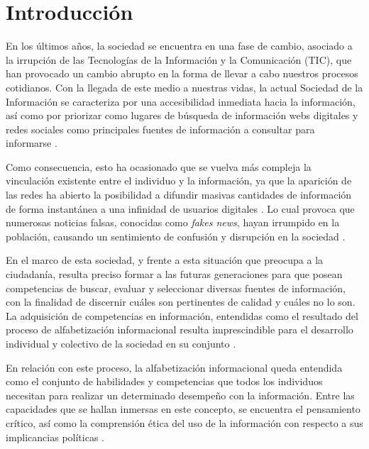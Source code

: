 \documentclass[spanish]{textolivre}
\begin{document}
\begin{polyabstract}
\begin{english}
\begin{abstract}
\end{abstract}
\end{english}

\end{polyabstract}


\section{Introducción}\label{intro}
En los últimos años, la sociedad se encuentra en una fase de cambio, asociado a la irrupción de las Tecnologías de la Información y la Comunicación (TIC), que han provocado un cambio abrupto en la forma de llevar a cabo nuestros procesos cotidianos. Con la llegada de este medio a nuestras vidas, la actual Sociedad de la Información se caracteriza por una accesibilidad inmediata hacia la información, así como por priorizar como lugares de búsqueda de información webs digitales y redes sociales como principales fuentes de información a consultar para informarse \cite{alfonso2019}. %

Como consecuencia, esto ha ocasionado que se vuelva más compleja la vinculación existente entre el individuo y la información, ya que la aparición de las redes ha abierto la posibilidad a difundir masivas cantidades de información de forma instantánea a una infinidad de usuarios digitales \cite{alonsoelat2020}. %
Lo cual provoca que numerosas noticias falsas, conocidas como \emph{fakes news}, hayan irrumpido en la población, causando un sentimiento de confusión y disrupción en la sociedad \cite{lopez-borrull2018}. %

En el marco de esta sociedad, y frente a esta situación que preocupa a la ciudadanía, resulta preciso formar a las futuras generaciones para que posean competencias de buscar, evaluar y seleccionar diversas fuentes de información, con la finalidad de discernir cuáles son pertinentes de calidad y cuáles no lo son. La adquisición de competencias en información, entendidas como el resultado del proceso de alfabetización informacional resulta imprescindible para el desarrollo individual y colectivo de la sociedad en su conjunto \cite{alonso-varela2020}. %

En relación con este proceso, la alfabetización informacional queda entendida como el conjunto de habilidades y competencias que todos los individuos necesitan para realizar un determinado desempeño con la información. Entre las capacidades que se hallan inmersas en este concepto, se encuentra el pensamiento crítico, así como la comprensión ética del uso de la información con respecto a sus implicancias políticas \cite{torrell2020}. %
\end{document}
